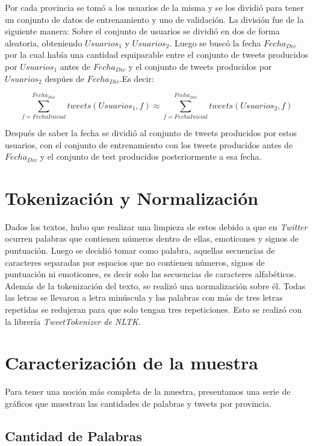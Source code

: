 Por cada provincia se tomó a los usuarios de la misma y se los dividió para tener un conjunto de datos de entrenamiento y uno de validación.
La división fue de la siguiente manera:
Sobre el conjunto de usuarios se dividió en dos de forma aleatoria, obteniendo $Usuarios_1$ y $Usuarios_2$. Luego se buscó la fecha $Fecha_{Div}$ por la cual había una cantidad equiparable entre el conjunto de tweets producidos por  $Usuarios_1$ antes de $Fecha_{Div}$ y el conjunto de tweets producidos por $Usuarios_2$ despúes de $Fecha_{Div}$.Es decir:

\begin{equation}
\sum_{ f = FechaInicial}^{Fecha_{Div}} tweets(Usuarios_1,f) \approx \sum_{ f = FechaInicial}^{Fecha_{Div}} tweets(Usuarios_2,f) 
\end{equation}

Después de saber la fecha se dividió al conjunto de tweets producidos por estos usuarios, con el conjunto de entrenamiento con los tweets producidos antes de $Fecha_{Div}$ y el conjunto de test producidos posteriormente a esa fecha.

\section{Tokenización y Normalización}

Dados los textos, hubo que realizar una limpieza de estos debido a que en \textit{Twitter} ocurren palabras que contienen números dentro de ellas, emoticones y signos de puntuación. Luego se decidió tomar como palabra, aquellas secuencias de caracteres separadas por espacios que no contienen números, signos de puntuación ni emoticones, es decir solo las secuencias de caracteres alfabéticos. 
Además de la tokenización del texto, se realizó una normalización sobre él. Todas las letras se llevaron a letra minúscula y las palabras con más de tres letras repetidas se redujeran para que solo tengan tres repeticiones. Esto se realizó con la librería \textit{TweetTokenizer de NLTK}. 

\section{Caracterización de la muestra}

Para tener una noción más completa de la muestra, presentamos una serie de gráficos que muestran las cantidades de palabras y tweets por provincia.

\subsection{Cantidad de Palabras}

